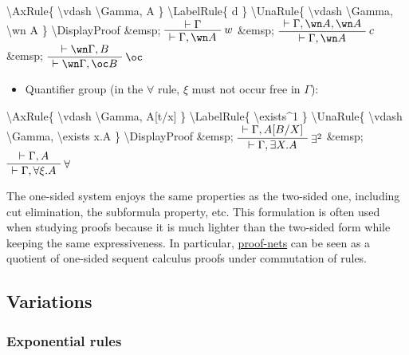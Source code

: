 \textbackslash{}AxRule\{ \textbackslash{}vdash \textbackslash{}Gamma, A
\} \textbackslash{}LabelRule\{ d \} \textbackslash{}UnaRule\{
\textbackslash{}vdash \textbackslash{}Gamma, \textbackslash{}wn A \}
\textbackslash{}DisplayProof \&emsp; \(\AxRule{ \vdash \Gamma }
\LabelRule{ w }
\UnaRule{ \vdash \Gamma, \wn A }
\DisplayProof\) \&emsp; \(\AxRule{ \vdash \Gamma, \wn A, \wn A }
\LabelRule{ c }
\UnaRule{ \vdash \Gamma, \wn A }
\DisplayProof\) \&emsp; \(\AxRule{ \vdash \wn\Gamma, B }
\LabelRule{ \oc }
\UnaRule{ \vdash \wn\Gamma, \oc B }
\DisplayProof\)

\begin{itemize}
\tightlist
\item
  Quantifier group (in the \(\forall\) rule, \(\xi\) must not occur free
  in \(\Gamma\)):

  \begin{description}
  \tightlist
  \item[]
  \end{description}
\end{itemize}

\textbackslash{}AxRule\{ \textbackslash{}vdash \textbackslash{}Gamma,
A{[}t/x{]} \} \textbackslash{}LabelRule\{ \textbackslash{}exists\^{}1 \}
\textbackslash{}UnaRule\{ \textbackslash{}vdash \textbackslash{}Gamma,
\textbackslash{}exists x.A \} \textbackslash{}DisplayProof \&emsp;
\(\AxRule{ \vdash \Gamma, A[B/X] }
\LabelRule{ \exists^2 }
\UnaRule{ \vdash \Gamma, \exists X.A }
\DisplayProof\) \&emsp; \(\AxRule{ \vdash \Gamma, A }
\LabelRule{ \forall }
\UnaRule{ \vdash \Gamma, \forall \xi.A }
\DisplayProof\)

The one-sided system enjoys the same properties as the two-sided one,
including cut elimination, the subformula property, etc. This
formulation is often used when studying proofs because it is much
lighter than the two-sided form while keeping the same expressiveness.
In particular, \url{proof-nets} can be seen as a quotient of one-sided
sequent calculus proofs under commutation of rules.

\subsection{Variations}\label{variations}

\subsubsection{Exponential rules}\label{exponential-rules}

